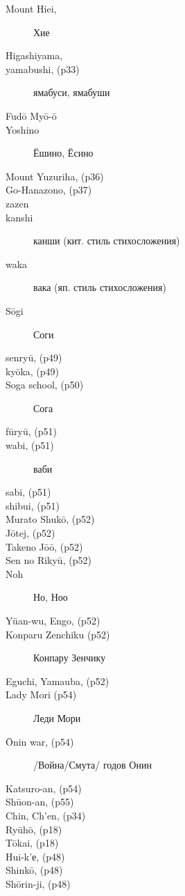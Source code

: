 \begin{description}
\item[Mount Hiei, ]  Хие
\item[Higashiyama, ]  
\item[yamabushi, (p33)] ямабуси, ямабуши 
\item[Fud\=o My\=o-\=o]
\item[Yoshino] Ёшино, Ёсино
\item[Mount Yuzuriha, (p36)] 
\item[Go-Hanazono, (p37)] 
\item[zazen]  
\item[kanshi] канши (кит. стиль стихосложения)  
\item[waka] вака (яп. стиль стихосложения)  
\item[S\=ogi] Соги  
\item[senry\=u, (p49)]
\item[ky\=oka, (p49)]
\item[Soga school, (p50)] Сога
\item[f\=ury\=u, (p51)]
\item[wabi, (p51)] ваби
\item[sabi, (p51)]
\item[shibui, (p51)]
\item[Murato Shuk\=o, (p52)]
\item[J\=otej, (p52)]
\item[Takeno J\=o\=o, (p52)]
\item[Sen no Riky\=u, (p52)]
\item[Noh] Но, Ноо
\item[Yüan-wu, Engo, (p52)]
\item[Konparu Zenchiku (p52)] Конпару Зенчику  
\item[Eguchi, Yamauba, (p52)]  
\item[Lady Mori (p54)] Леди Мори
\item[\=Onin war, (p54)] /Война/Смута/ годов Онин
\item[Katsuro-an, (p54)]
\item[Sh\=uon-an, (p55)]  
\item[Chin, Ch'en, (p34)]  
\item[Ry\=uh\=o, (p18)]
\item[T\=okai, (p18)]  
\item[Hui-k'е, (p48)]
\item[Shink\=o, (p48)]
\item[Sh\=orin-ji, (p48)]
\end{description}
